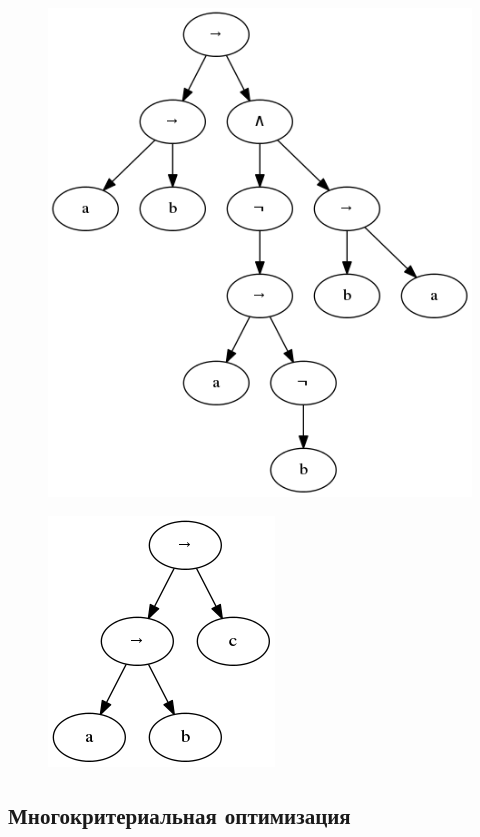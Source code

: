 \documentclass[12pt,fleqn]{article}
\begin{document}
\begin{figure}[!h]
  \centering
    \includegraphics[scale=0.45]{t9.png}
\end{figure}

\begin{figure}[!h]
  \centering
    \includegraphics[scale=0.45]{t10.png}
\end{figure}

\FloatBarrier

\subsection{Многокритериальная оптимизация}
\end{document}
